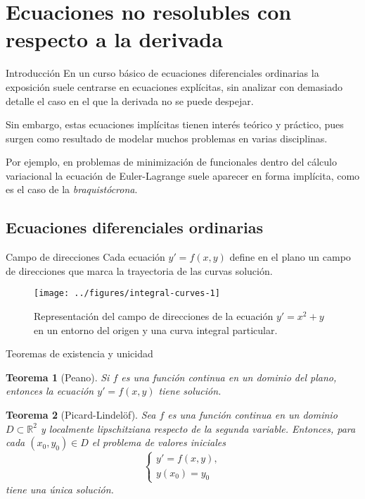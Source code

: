 \documentclass[10pt, spanish]{beamer}
\newtheorem{teorema}{Teorema}
\begin{document}
\section{Ecuaciones no resolubles con respecto a la derivada}


\begin{frame}{Introducción}
En un curso básico de ecuaciones diferenciales ordinarias la exposición suele centrarse en ecuaciones explícitas, sin analizar con demasiado detalle el caso en el que la derivada no se puede despejar.

Sin embargo, estas ecuaciones implícitas tienen interés teórico y práctico, pues surgen como resultado de modelar muchos problemas en varias disciplinas.

Por ejemplo, en problemas de minimización de funcionales dentro del cálculo variacional la ecuación de Euler-Lagrange suele aparecer en forma implícita, como es el caso de la \textit{braquistócrona}.
\end{frame}

\subsection{Ecuaciones diferenciales ordinarias}

\begin{frame}{Campo de direcciones}
  Cada ecuación $y'=f(x,y)$ define en el plano un campo de direcciones que marca la trayectoria de las curvas solución.

  \begin{figure}
	\centering
	\texttt{[image: ../figures/integral-curves-1]}
	\caption{\footnotesize Representación del campo de direcciones de la ecuación $y'=x^2+y$ en un entorno del origen y una curva integral particular.}
\end{figure}
\end{frame}

\begin{frame}{Teoremas de existencia y unicidad}
\begin{teorema}[Peano]
  Si $f$ es una función continua en un dominio del plano, entonces la ecuación $y'=f(x,y)$ tiene solución.
\end{teorema}

\begin{teorema}[Picard-Lindelöf]
  Sea $f$ es una función continua en un dominio $D \subset \mathbb{R}^2$ y localmente lipschitziana respecto de la segunda variable. Entonces, para cada $(x_0,y_0)\in D$ el problema de valores iniciales
  \[
    \begin{cases}
      y'=f(x,y),\\
      y(x_0)=y_0
    \end{cases}
  \]
  tiene una única solución.
\end{teorema}
\end{frame}
\end{document}
